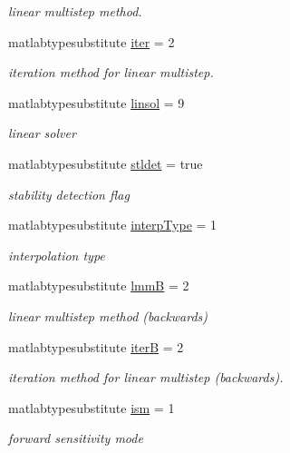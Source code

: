 \begin{DoxyCompactItemize}
\begin{DoxyCompactList}\small\item\em linear multistep method. \end{DoxyCompactList}\item 
matlabtypesubstitute \hyperlink{classamioption_a1fc3ae6bd5c6a80e9b81b27fc7b7a11a}{iter} = 2
\begin{DoxyCompactList}\small\item\em iteration method for linear multistep. \end{DoxyCompactList}\item 
matlabtypesubstitute \hyperlink{classamioption_a06749b49eaa313f4d00f0115d3a7a7f3}{linsol} = 9
\begin{DoxyCompactList}\small\item\em linear solver \end{DoxyCompactList}\item 
matlabtypesubstitute \hyperlink{classamioption_a202e02f7d8c1a87b1c675bcc1acf1c8e}{stldet} = true
\begin{DoxyCompactList}\small\item\em stability detection flag \end{DoxyCompactList}\item 
matlabtypesubstitute \hyperlink{classamioption_ad06cc805fa18b06ac937fd98a9eba0e7}{interp\+Type} = 1
\begin{DoxyCompactList}\small\item\em interpolation type \end{DoxyCompactList}\item 
matlabtypesubstitute \hyperlink{classamioption_afbc60e75d11740bf27f5a7fc5706fd44}{lmm\+B} = 2
\begin{DoxyCompactList}\small\item\em linear multistep method (backwards) \end{DoxyCompactList}\item 
matlabtypesubstitute \hyperlink{classamioption_ae6a49cec21ffe790217be29b0fced832}{iter\+B} = 2
\begin{DoxyCompactList}\small\item\em iteration method for linear multistep (backwards). \end{DoxyCompactList}\item 
matlabtypesubstitute \hyperlink{classamioption_aada9d6834569ad5c542cb8dc6b26ea46}{ism} = 1
\begin{DoxyCompactList}\small\item\em forward sensitivity mode \end{DoxyCompactList}\item 

\end{DoxyCompactItemize}
